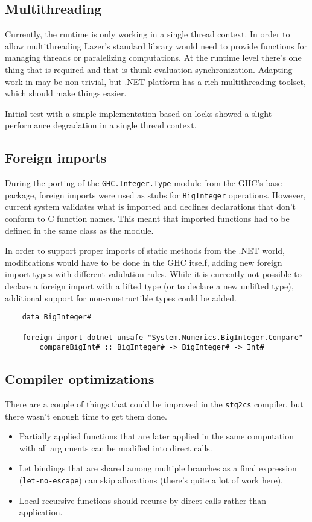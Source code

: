 \documentclass[en]{pracamgr}
\begin{document}
\subsection{Multithreading}
Currently, the runtime is only working in a single thread context. In order to allow multithreading
Lazer's standard library would need to provide functions for managing threads or paralelizing
computations. At the runtime level there's one thing that is required and that is thunk evaluation
synchronization. Adapting work in \cite{multiprocessor} may be non-trivial, but .NET platform has
a rich multithreading toolset, which should make things easier.

Initial test with a simple implementation based on locks showed a slight performance degradation
in a single thread context.

\subsection{Foreign imports}
During the porting of the \texttt{GHC.Integer.Type} module from the GHC's base package,
foreign imports were used as stubs for \texttt{BigInteger} operations.
However, current system validates what is imported and declines declarations that don't conform
to C function names. This meant that imported functions had to be defined in the same class as the module.

In order to support proper imports of static methods from the .NET world, modifications would have
to be done in the GHC itself, adding new foreign import types with different validation rules.
While it is currently not possible to declare a foreign import with a lifted type (or to declare a new unlifted type),
additional support for non-constructible types could be added.

\begin{verbatim}
    data BigInteger#

    foreign import dotnet unsafe "System.Numerics.BigInteger.Compare"
        compareBigInt# :: BigInteger# -> BigInteger# -> Int#
\end{verbatim}

\subsection{Compiler optimizations}
There are a couple of things that could be improved in the \texttt{stg2cs} compiler, but there wasn't
enough time to get them done.
\begin{itemize}
    \item Partially applied functions that are later applied in the same computation
            with all arguments can be modified into direct calls.
    \item Let bindings that are shared among multiple branches as a final expression (\texttt{let-no-escape})
            can skip allocations (there's quite a lot of work here).
    \item Local recursive functions should recurse by direct calls rather than application.
\end{itemize}
\end{document}
